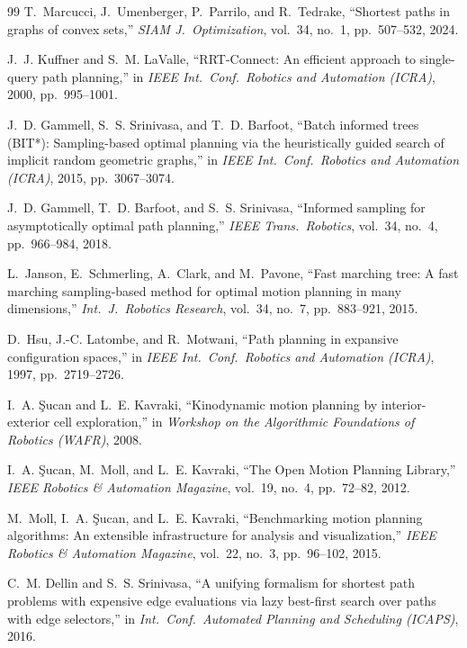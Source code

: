 \documentclass[journal]{IEEEtran}
\begin{document}
\begin{thebibliography}{99}
T.~Marcucci, J.~Umenberger, P.~Parrilo, and R.~Tedrake, ``Shortest
paths in graphs of convex sets,'' \emph{SIAM J.\ Optimization},
vol.~34, no.~1, pp.~507--532, 2024.

J.~J. Kuffner and S.~M. LaValle, ``RRT-Connect: An efficient
approach to single-query path planning,'' in \emph{IEEE Int.\ Conf.\
Robotics and Automation (ICRA)}, 2000, pp.~995--1001.

J.~D. Gammell, S.~S. Srinivasa, and T.~D. Barfoot, ``Batch informed
trees (BIT*): Sampling-based optimal planning via the heuristically
guided search of implicit random geometric graphs,'' in \emph{IEEE
Int.\ Conf.\ Robotics and Automation (ICRA)}, 2015, pp.~3067--3074.

J.~D. Gammell, T.~D. Barfoot, and S.~S. Srinivasa, ``Informed
sampling for asymptotically optimal path planning,'' \emph{IEEE
Trans.\ Robotics}, vol.~34, no.~4, pp.~966--984, 2018.

L.~Janson, E.~Schmerling, A.~Clark, and M.~Pavone, ``Fast marching
tree: A fast marching sampling-based method for optimal motion
planning in many dimensions,'' \emph{Int.\ J.\ Robotics Research},
vol.~34, no.~7, pp.~883--921, 2015.

D.~Hsu, J.-C. Latombe, and R.~Motwani, ``Path planning in expansive
configuration spaces,'' in \emph{IEEE Int.\ Conf.\ Robotics and
Automation (ICRA)}, 1997, pp.~2719--2726.

I.~A. {\c S}ucan and L.~E. Kavraki, ``Kinodynamic motion planning by
interior-exterior cell exploration,'' in \emph{Workshop on the
Algorithmic Foundations of Robotics (WAFR)}, 2008.

I.~A. {\c S}ucan, M.~Moll, and L.~E. Kavraki, ``The Open Motion
Planning Library,'' \emph{IEEE Robotics \& Automation Magazine},
vol.~19, no.~4, pp.~72--82, 2012.

M.~Moll, I.~A. {\c S}ucan, and L.~E. Kavraki, ``Benchmarking motion
planning algorithms: An extensible infrastructure for analysis and
visualization,'' \emph{IEEE Robotics \& Automation Magazine},
vol.~22, no.~3, pp.~96--102, 2015.

C.~M. Dellin and S.~S. Srinivasa, ``A unifying formalism for
shortest path problems with expensive edge evaluations via lazy
best-first search over paths with edge selectors,'' in \emph{Int.\
Conf.\ Automated Planning and Scheduling (ICAPS)}, 2016.


\end{thebibliography}
\end{document}
